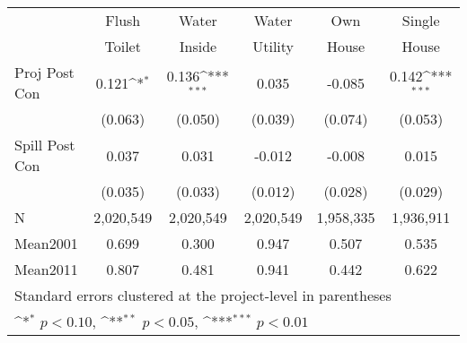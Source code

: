 {
\def\sym#1{\ifmmode^{#1}\else\(^{#1}\)\fi}
\begin{tabular}{l*{5}{c}}
                &\multicolumn{1}{c}{Flush}&\multicolumn{1}{c}{Water}&\multicolumn{1}{c}{Water}&\multicolumn{1}{c}{Own}&\multicolumn{1}{c}{Single}\\
                &\multicolumn{1}{c}{Toilet}&\multicolumn{1}{c}{Inside}&\multicolumn{1}{c}{Utility}&\multicolumn{1}{c}{House}&\multicolumn{1}{c}{House}\\
\hline
Proj Post Con &    0.121\sym{*}  &    0.136\sym{***}&    0.035         &   -0.085         &    0.142\sym{***}\\
                &  (0.063)         &  (0.050)         &  (0.039)         &  (0.074)         &  (0.053)         \\
[1em]
Spill Post Con &    0.037         &    0.031         &   -0.012         &   -0.008         &    0.015         \\
                &  (0.035)         &  (0.033)         &  (0.012)         &  (0.028)         &  (0.029)         \\
\hline
N               &2,020,549         &2,020,549         &2,020,549       &1,958,335         &1,936,911         \\
Mean2001        &    0.699         &    0.300         &    0.947         &    0.507         &    0.535         \\
Mean2011        &    0.807         &    0.481         &    0.941         &    0.442         &    0.622         \\
\hline
\multicolumn{6}{l}{\footnotesize Standard errors clustered at the project-level in parentheses}\\
\multicolumn{6}{l}{\footnotesize \sym{*} \(p<0.10\), \sym{**} \(p<0.05\), \sym{***} \(p<0.01\)}\\
\end{tabular}
}
